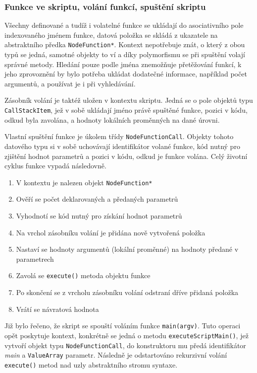 \documentclass[11pt,twoside,a4paper]{book}
\begin{document}
\subsubsection{Funkce ve skriptu, volání funkcí, spuštění skriptu}

Všechny definované a tudíž i volatelné funkce se ukládají do asociativního pole indexovaného jménem funkce, datová položka se skládá z ukazatele na abstraktního předka \texttt{NodeFunction*}. Kontext nepotřebuje znát, o který z obou typů se jedná, samotné objekty to ví a díky polymorfismu se při spuštění volají správné metody. Hledání pouze podle jména znemožňuje přetěžování funkcí, k jeho zprovoznění by bylo potřeba ukládat dodatečné informace, na\-pří\-klad počet argumentů, a používat je i při vyhledávání.

Zásobník volání je taktéž uložen v kontextu skriptu. Jedná se o pole objektů typu \texttt{Call\-Stack\-Item}, jež v sobě ukládají jméno právě spuštěné funkce, pozici v kódu, odkud byla zavolána, a hodnoty lokálních proměnných na dané úrovni.

Vlastní spuštění funkce je úkolem třídy \texttt{NodeFunctionCall}. Objekty tohoto datového typu si v sobě uchovávají identifikátor volané funkce, kód nutný pro zjištění hodnot parametrů a pozici v kódu, odkud je funkce volána. Celý životní cyklus funkce vypadá následovně.

\begin{enumerate}
\item V kontextu je nalezen objekt \texttt{NodeFunction*}
\item Ověří se počet deklarovaných a předaných parametrů
\item Vyhodnotí se kód nutný pro získání hodnot parametrů
\item Na vrchol zásobníku volání je přidána nově vytvořená položka
\item Nastaví se hodnoty argumentů (lokální proměnné) na hodnoty předané v parametrech
\item Zavolá se \texttt{execute()} metoda objektu funkce
\item Po skončení se z vrcholu zásobníku volání odstraní dříve přidaná položka
\item Vrátí se návratová hodnota
\end{enumerate}

Již bylo řečeno, že skript se spouští voláním funkce \texttt{main(argv)}. Tuto operaci opět poskytuje kontext, konkrétně se jedná o metodu \texttt{executeScriptMain()}, jež vytvoří objekt typu \texttt{NodeFunctionCall}, do konstruktoru mu předá identifikátor \textit{main} a \texttt{ValueArray} parametr. Následně je odstartováno rekurzivní volání \texttt{execute()} metod nad uzly abstraktního stromu syntaxe.
\end{document}
